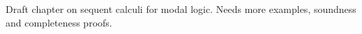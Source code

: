 \documentclass[../../../include/open-logic-chapter]{subfiles}
\begin{document}


\begin{editorial}
  Draft chapter on sequent calculi for modal logic. Needs more
  examples, soundness and completeness proofs.
\end{editorial}








\OLEndChapterHook
\end{document}

